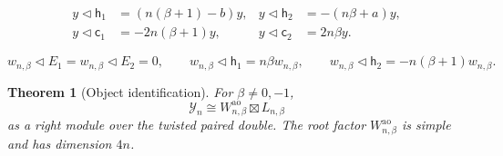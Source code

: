 \documentclass[10pt,a4paper]{amsart}
\newtheorem{theorem}{Theorem}
\newcommand{\ao}{\mathrm{ao}}
\newcommand{\tri}{\mathbin{\triangleleft}}
\begin{document}
\begin{equation}\label{eq:root-center-actions}
\begin{aligned}
 y\tri\mathsf h_1&=(n(\beta+1)-b)y,&
 y\tri\mathsf h_2&=-(n\beta+a)y,\\
 y\tri\mathsf c_1&=-2n(\beta+1)y,&
 y\tri\mathsf c_2&=2n\beta y.
\end{aligned}
\end{equation}

\begin{equation}\label{eq:highest-weight}
 w_{n,\beta}\tri E_1=w_{n,\beta}\tri E_2=0,\qquad
 w_{n,\beta}\tri\mathsf h_1=n\beta w_{n,\beta},\qquad
 w_{n,\beta}\tri\mathsf h_2=-n(\beta+1)w_{n,\beta}.
\end{equation}

\begin{theorem}[Object identification]\label{thm:object}
For \(\beta\neq0,-1\),
\begin{equation}\label{eq:object}
 \mathcal Y_n
 \cong W_{n,\beta}^{\ao}\boxtimes L_{n,\beta}
\end{equation}
as a right module over the twisted paired double.  The root factor
\(W_{n,\beta}^{\ao}\) is simple and has dimension \(4n\).
\end{theorem}
\end{document}
